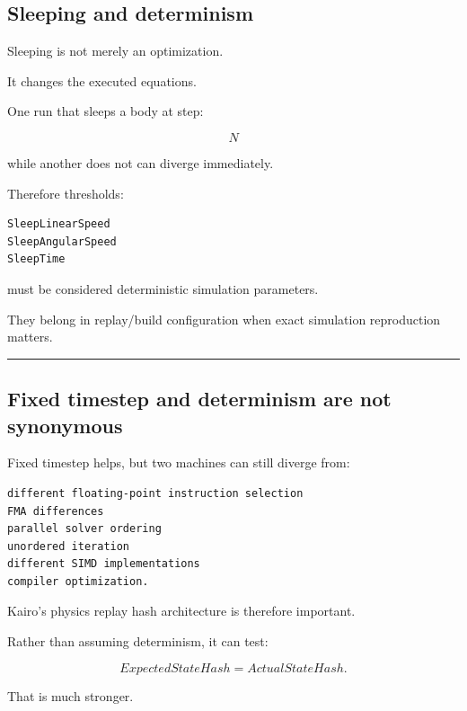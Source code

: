 \subsection{Sleeping and determinism}\label{06-engine-ii-ch037-sleeping-and-determinism}

\hypertarget{06-engine-ii-ch037-sleeping-and-determinism}{}

Sleeping is not merely an optimization.

It changes the executed equations.

One run that sleeps a body at step:

\[
N
\]

while another does not can diverge immediately.

Therefore thresholds:

\begin{verbatim}
SleepLinearSpeed
SleepAngularSpeed
SleepTime
\end{verbatim}

must be considered deterministic simulation parameters.

They belong in replay/build configuration when exact simulation reproduction matters.

\begin{center}\rule{0.5\linewidth}{0.5pt}\end{center}

\subsection{Fixed timestep and determinism are not synonymous}\label{06-engine-ii-ch037-fixed-timestep-and-determinism-are-not-synonymous}

\hypertarget{06-engine-ii-ch037-fixed-timestep-and-determinism-are-not-synonymous}{}

Fixed timestep helps, but two machines can still diverge from:

\begin{verbatim}
different floating-point instruction selection
FMA differences
parallel solver ordering
unordered iteration
different SIMD implementations
compiler optimization.
\end{verbatim}

Kairo's physics replay hash architecture is therefore important.

Rather than assuming determinism, it can test:

\[
ExpectedStateHash
=
ActualStateHash.
\]

That is much stronger.

